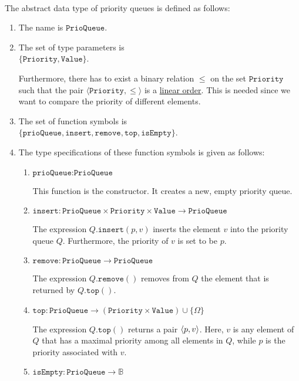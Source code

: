 \begin{Definition} \hspace*{\fill} \\
  The abstract data type of priority queues is defined as follows:
  \begin{enumerate}
  \item The name is $\texttt{PrioQueue}$.
  \item The set of type parameters is \\[0.1cm]
        \hspace*{1.3cm} $\{ \texttt{Priority}, \texttt{Value} \}$.

        Furthermore, there has to exist a binary relation $\leq$ on the set $\texttt{Priority}$ such that
        the pair $\langle \texttt{Priority}, \leq \rangle$ is a \hyperref[def:linear_order]{linear order}.
        This is needed since we want to compare the priority of different elements.
  \item The set of function symbols is \\[0.1cm]
       \hspace*{1.3cm} 
       $\{ \texttt{prioQueue}, \texttt{insert}, \texttt{remove}, \texttt{top}, \texttt{isEmpty} \}$.
  \item The type specifications of these function symbols is given as follows:
        \begin{enumerate}
        \item $\texttt{prioQueue}: \texttt{PrioQueue}$

              This function is the constructor. It creates a new, empty priority queue.
        \item $\texttt{insert}: \texttt{PrioQueue} \times \texttt{Priority} \times \texttt{Value} \rightarrow \texttt{PrioQueue}$

              The expression $Q.\texttt{insert}(p,v)$ inserts the  element $v$ into the priority queue $Q$.
              Furthermore, the priority of $v$ is set to be $p$.
        \item $\texttt{remove}: \texttt{PrioQueue} \rightarrow \texttt{PrioQueue}$

              The expression $Q.\texttt{remove}()$ removes from $Q$ the element that is returned by
              $Q.\texttt{top}()$.
        \item $\texttt{top}: \texttt{PrioQueue}  \rightarrow (\texttt{Priority} \times \texttt{Value}) \cup \{\Omega\}$

              The expression $Q.\texttt{top}()$ returns a pair $\pair(p,v)$.  Here,  $v$ is any
              element of $Q$ that has a  maximal priority among all elements in $Q$, while $p$ is
              the priority associated with $v$. 
        \item $\texttt{isEmpty}: \texttt{PrioQueue} \rightarrow \mathbb{B}$


\end{enumerate}
\end{enumerate}
\end{Definition}
